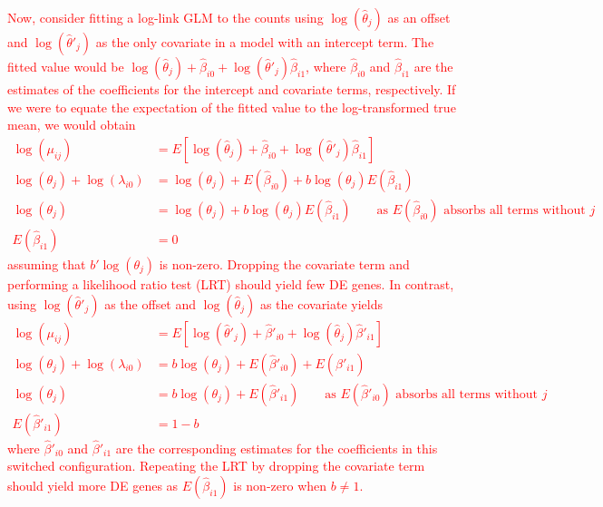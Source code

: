 \documentclass{article}
\newcommand\revised[1]{\textcolor{red}{#1}}
\begin{document}
\revised{Now, consider fitting a log-link GLM to the counts using $\log(\hat\theta_j)$ as an offset and $\log(\hat\theta'_j)$ as the only covariate in a model with an intercept term.
The fitted value would be $\log(\hat\theta_j) + \hat\beta_{i0} + \log(\hat\theta'_j)\hat\beta_{i1}$, where $\hat\beta_{i0}$ and $\hat\beta_{i1}$ are the estimates of the coefficients for the intercept and covariate terms, respectively.
If we were to equate the expectation of the fitted value to the log-transformed true mean, we would obtain
\begin{align*}
    \log(\mu_{ij}) &= E[\log(\hat\theta_j) + \hat\beta_{i0} + \log(\hat\theta'_j)\hat\beta_{i1}] \\
    \log(\theta_j) + \log(\lambda_{i0}) &=  \log(\theta_j) + E(\hat\beta_{i0}) + b \log(\theta_j) E(\hat\beta_{i1}) \\
    \log(\theta_j) &=  \log(\theta_j) + b\log(\theta_j)E(\hat\beta_{i1}) \qquad\mbox{as $E(\hat\beta_{i0})$ absorbs all terms without $j$}\\
    E(\hat\beta_{i1}) &= 0 
\end{align*}
assuming that $b'\log(\theta_j)$ is non-zero. 
Dropping the covariate term and performing a likelihood ratio test (LRT) should yield few DE genes.
In contrast, using $\log(\hat\theta'_j)$ as the offset and $\log(\hat\theta_j)$ as the covariate yields 
\begin{align*}
    \log(\mu_{ij}) &= E[\log(\hat\theta'_j) + \hat\beta'_{i0} + \log(\hat\theta_j)\hat\beta'_{i1}] \\
    \log(\theta_j) + \log(\lambda_{i0}) &=  b\log(\theta_j) + E(\hat\beta'_{i0}) + E(\hat\beta'_{i1}) \\
    \log(\theta_j) &=  b\log(\theta_j) + E(\hat\beta'_{i1}) \qquad\mbox{as $E(\hat\beta'_{i0})$ absorbs all terms without $j$}\\
    E(\hat\beta'_{i1}) &= 1- b
\end{align*}
where $\hat\beta'_{i0}$ and $\hat\beta'_{i1}$ are the corresponding estimates for the coefficients in this switched configuration.
Repeating the LRT by dropping the covariate term should yield more DE genes as $E(\hat\beta_{i1})$ is non-zero when $b\neq1$.}
\end{document}
